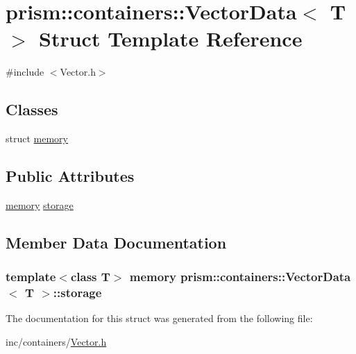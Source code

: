 \hypertarget{structprism_1_1containers_1_1_vector_data}{}\section{prism\+:\+:containers\+:\+:Vector\+Data$<$ T $>$ Struct Template Reference}
\label{structprism_1_1containers_1_1_vector_data}


{\ttfamily \#include $<$Vector.\+h$>$}

\subsection*{Classes}
\begin{DoxyCompactItemize}
\item 
struct \hyperlink{structprism_1_1containers_1_1_vector_data_1_1memory}{memory}
\end{DoxyCompactItemize}
\subsection*{Public Attributes}
\begin{DoxyCompactItemize}
\item 
\hyperlink{structprism_1_1containers_1_1_vector_data_1_1memory}{memory} \hyperlink{structprism_1_1containers_1_1_vector_data_a872cbb4d7faeab4c43ac5954b7969036}{storage}
\end{DoxyCompactItemize}


\subsection{Member Data Documentation}
\subsubsection[{\texorpdfstring{storage}{storage}}]{\setlength{\rightskip}{0pt plus 5cm}template$<$class T$>$ {\bf memory} {\bf prism\+::containers\+::\+Vector\+Data}$<$ T $>$\+::storage}\hypertarget{structprism_1_1containers_1_1_vector_data_a872cbb4d7faeab4c43ac5954b7969036}{}\label{structprism_1_1containers_1_1_vector_data_a872cbb4d7faeab4c43ac5954b7969036}


The documentation for this struct was generated from the following file\+:\begin{DoxyCompactItemize}
\item 
inc/containers/\hyperlink{_vector_8h}{Vector.\+h}\end{DoxyCompactItemize}
